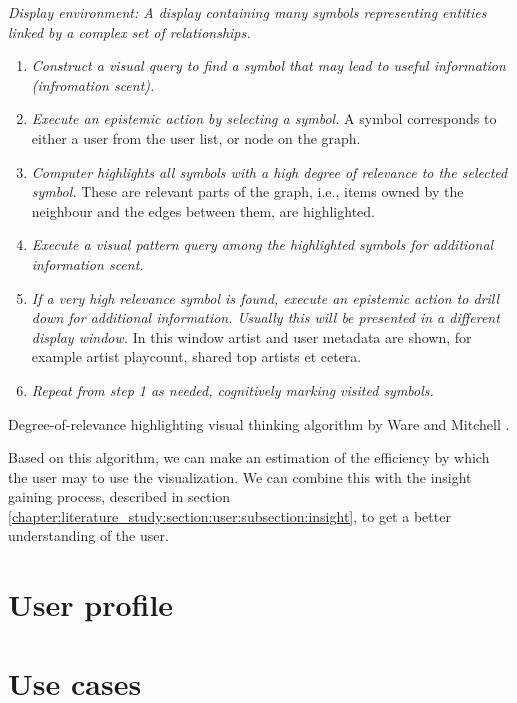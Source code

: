 \begin{table}
	\textit{Display environment: A display containing many symbols representing entities linked by a complex set of relationships.}

	\begin{enumerate}
		\item \textit{Construct a visual query to find a symbol that may lead to useful information (infromation scent).}
		\item \textit{Execute an epistemic action by selecting a symbol.} A symbol corresponds to either a user from the user list, or node on the graph.
		\item \textit{Computer highlights all symbols with a high degree of relevance to the selected symbol.} These are relevant parts of the graph, i.e., items owned by the neighbour and the edges between them, are highlighted.
		\item \textit{Execute a visual pattern query among the highlighted symbols for additional information scent.}
		\item \textit{If a very high relevance symbol is found, execute an epistemic action to drill down for additional information. Usually this will be presented in a different display window.} In this window artist and user metadata are shown, for example artist playcount, shared top artists et cetera.
		\item \textit{Repeat from step 1 as needed, cognitively marking visited symbols.}
	\end{enumerate}
\caption{Degree-of-relevance highlighting visual thinking algorithm by Ware and Mitchell \cite{ware:2004}.}
\label{table:visual_thinking_algorithm}
\end{table}

Based on this algorithm, we can make an estimation of the efficiency by which the user may to use the visualization. We can combine this with the insight gaining process, described in section \ref{chapter:literature_study:section:user:subsection:insight}, to get a better understanding of the user.




\section{User profile}



\section{Use cases}






